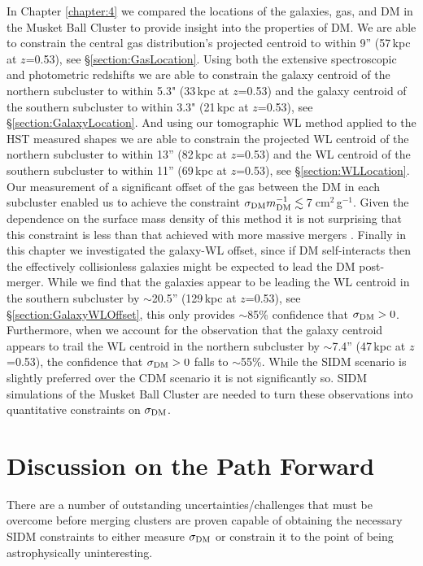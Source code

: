 In Chapter \ref{chapter:4} we compared the locations of the galaxies, gas, and DM in the Musket Ball Cluster to provide insight into the properties of DM.
We are able to constrain the central gas distribution's projected centroid to within 9'' (57\,kpc at $z$=0.53), see \S\ref{section:GasLocation}.
Using both the extensive spectroscopic and photometric redshifts we are able to constrain the galaxy centroid of the northern subcluster to within 5.3" (33\,kpc at $z$=0.53) and the galaxy centroid of the southern subcluster to within 3.3" (21\,kpc at $z$=0.53), see \S\ref{section:GalaxyLocation}.
And using our tomographic WL method applied to the HST measured shapes we are able to constrain the projected WL centroid of the northern subcluster to within 13'' (82\,kpc at $z$=0.53) and the WL centroid of the southern subcluster to within 11'' (69\,kpc at $z$=0.53), see \S\ref{section:WLLocation}.
Our measurement of a significant offset of the gas between the DM in each subcluster enabled us to achieve the constraint $\sigma_{\rm DM} m_{\rm DM}^{-1} \lesssim 7$\,cm$^2$\,g$^{-1}$.
Given the dependence on the surface mass density of this method it is not surprising that this constraint is less than that achieved with more massive mergers \citep{Markevitch:2004dl, Bradac:2008gw, Merten:2011gu}.
Finally in this chapter we investigated the galaxy-WL offset, since if DM self-interacts then the effectively collisionless galaxies might be expected to lead the DM post-merger.
While we find that the galaxies appear to be leading the WL centroid in the southern subcluster by $\sim$20.5'' (129\,kpc at $z$=0.53), see \S\ref{section:GalaxyWLOffset}, this only provides $\sim$85\% confidence that $\sigma_{\rm DM}>0$.
Furthermore, when we account for the observation that the galaxy centroid appears to trail the WL centroid in the northern subcluster by $\sim$7.4'' (47\,kpc at $z$=0.53), the confidence that $\sigma_{\rm DM}>0$ falls to $\sim$55\%.
While the SIDM scenario is slightly preferred over the CDM scenario it is not significantly so.
SIDM simulations of the Musket Ball Cluster are needed to turn these observations into quantitative constraints on $\sigma_{\rm DM}$.


\section{Discussion on the Path Forward}

There are a number of outstanding uncertainties/challenges that must be overcome before merging clusters are proven capable of obtaining the necessary SIDM constraints to either measure $\sigma_{\rm DM}$ or constrain it to the point of being astrophysically uninteresting.

